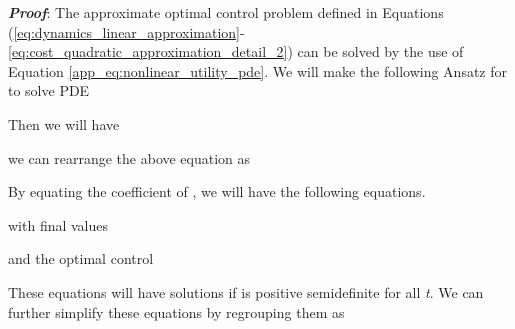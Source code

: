 \documentclass[letterpaper, 10 pt, conference]{ieeeconf}
\begin{document}
\textbf{\textit{Proof}}: 
The approximate optimal control problem defined in Equations\! (\ref{eq:dynamics_linear_approximation}-\ref{eq:cost_quadratic_approximation_detail_2}) can be solved by the use of Equation \eqref{app_eq:nonlinear_utility_pde}. We will make the following Ansatz for  to solve PDE
 

Then we will have 

we can rearrange the above equation as



By equating the coefficient of , we will have the following equations.

with final values

and the optimal control



These equations will have solutions if  is positive semidefinite for all \textit{t}. We
can further simplify these equations by regrouping them as
\end{document}
